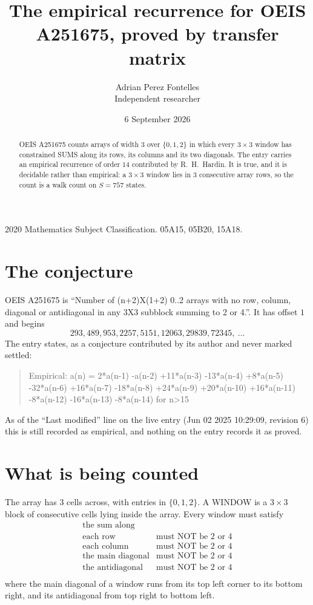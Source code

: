 \documentclass[11pt,a4paper]{article}
\title{The empirical recurrence for OEIS A251675, proved by transfer matrix}
\author{Adrian Perez Fontelles\\ \small Independent researcher}
\date{6 September 2026}
\theoremstyle{plain}
\theoremstyle{definition}
\begin{document}
\maketitle

\begin{abstract}
OEIS A251675 counts arrays of width $3$ over $\{0,1,2\}$ in which every $3\times3$ window has
constrained SUMS along its rows, its columns and its two diagonals. The entry carries an
empirical recurrence of order $14$ contributed by R.~H.~Hardin. It is true, and it is
decidable rather than empirical: a $3\times3$ window lies in $3$ consecutive array rows,
so the count is a walk count on $S=757$ states.
\end{abstract}

\noindent\small 2020 Mathematics Subject Classification. 05A15, 05B20, 15A18.\normalsize

\section{The conjecture}

OEIS A251675 is ``Number of (n+2)X(1+2) 0..2 arrays with no row, column, diagonal or antidiagonal in any 3X3 subblock summing to 2 or 4.''. It has offset $1$ and begins
\[
293, 489, 953, 2257, 5151, 12063, 29839, 72345,\ \dots
\]
The entry states, as a conjecture contributed by its author and never marked settled:
\begin{quote}
Empirical: a(n) = 2*a(n-1) -a(n-2) +11*a(n-3) -13*a(n-4) +8*a(n-5) -32*a(n-6) +16*a(n-7) -18*a(n-8) +24*a(n-9) +20*a(n-10) +16*a(n-11) -8*a(n-12) -16*a(n-13) -8*a(n-14) for n>15
\end{quote}
As of the ``Last modified'' line on the live entry (Jun 02 2025 10:29:09, revision 6) this is still
recorded as empirical, and nothing on the entry records it as proved.

\section{What is being counted}

The array has $3$ cells across, with entries in $\{0,1,2\}$. A WINDOW is a $3\times3$ block
of consecutive cells lying inside the array. Every window must satisfy
\[
\begin{array}{ll}
\text{the sum along} & \text{} \\[2pt]
\text{each row} & \text{must NOT be 2 or 4} \\
\text{each column} & \text{must NOT be 2 or 4} \\
\text{the main diagonal} & \text{must NOT be 2 or 4} \\
\text{the antidiagonal} & \text{must NOT be 2 or 4} \\
\end{array}
\]
where the main diagonal of a window runs from its top left corner to its bottom right, and its
antidiagonal from top right to bottom left.
\end{document}
